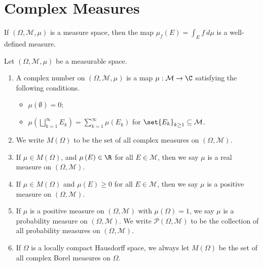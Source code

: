 \section{Complex Measures}%
\begin{example}
  If $\left(\Omega,\mathcal{M},\mu\right)$ is a measure space, then the map $\mu_f(E) = \int_{E}^{} f\:d\mu$ is a well-defined measure.
\end{example}
\begin{definition}
  Let $\left(\Omega,\mathcal{M},\mu\right)$ be a measurable space.
  \begin{enumerate}[(1)]
    \item A complex number on $\left(\Omega,\mathcal{M},\mu\right)$ is a map $\mu: \mathcal{M}\rightarrow \C$ satisfying the following conditions.
      \begin{itemize}
        \item $\mu\left(\emptyset\right) = 0$;
        \item $\displaystyle \mu\left(\bigsqcup_{k=1}^{\infty}E_k\right) = \sum_{k=1}^{\infty}\mu\left(E_k\right)$ for $\set{E_k}_{k\geq 1}\subseteq \mathcal{M}$.
      \end{itemize}
    \item We write $M\left(\Omega\right)$ to be the set of all complex measures on $\left(\Omega,\mathcal{M}\right)$.
    \item If $\mu\in M\left(\Omega\right)$, and $\mu\left(E\right)\in \R$ for all $E\in \mathcal{M}$, then we say $\mu$ is a real measure on $\left(\Omega,\mathcal{M}\right)$.
    \item If $\mu\in M\left(\Omega\right)$ and $\mu(E) \geq 0$ for all $E\in \mathcal{M}$, then we say $\mu$ is a positive measure on $\left(\Omega,\mathcal{M}\right)$.
    \item If $\mu$ is a positive measure on $\left(\Omega,\mathcal{M}\right)$ with $\mu\left(\Omega\right) = 1$, we say $\mu$ is a probability measure on $\left(\Omega,\mathcal{M}\right)$. We write $\mathcal{P}\left(\Omega,\mathcal{M}\right)$ to be the collection of all probability measures on $\left(\Omega,\mathcal{M}\right)$.
    \item If $\Omega$ is a locally compact Hausdorff space, we always let $M\left(\Omega\right)$ be the set of all complex Borel measures on $\Omega$.
  \end{enumerate}
\end{definition}
